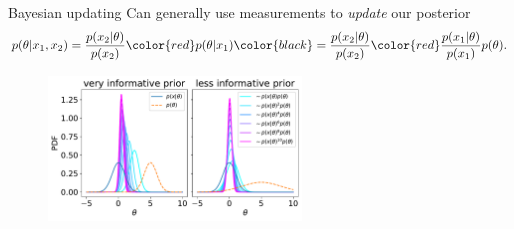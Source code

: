 \documentclass[
aspectratio=169,
14pt,
professionalfonts
]{beamer}
\begin{document}
\begin{frame}{Bayesian updating}
    \vspace{-0.5cm}
    Can generally use measurements to \textit{update} our posterior
    $$
    p(\theta | x_1, x_2) 
    = \frac{p(x_2|\theta)}{p(x_2)} \color{red} p(\theta | x_1) \color{black}
    = \frac{p(x_2|\theta)}{p(x_2)} \color{red} \frac{p(x_1|\theta)}{p(x_1)} p(\theta).
    $$

    \begin{figure}
        \centering
        \includegraphics[width=0.6\textwidth]{../plots/updating.pdf}
    \end{figure}


\end{frame}
\end{document}
